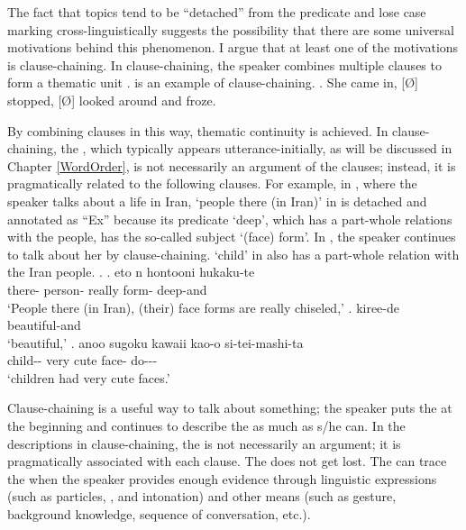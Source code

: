 The fact that topics tend to be ``detached'' from the predicate and
lose case marking cross-linguistically suggests the possibility that
there are some universal motivations behind this phenomenon.
I argue that at least one of the motivations is clause-chaining.
In clause-chaining,
the speaker combines multiple clauses to form a thematic unit
\cite{longacre85,martin92,givon01}.
\Next is an example of clause-chaining.
%
\ex. She came in, [\O] stopped, [\O] looked around and froze.\\
     \hfill{\cite[349]{givon01}}

By combining clauses in this way,
thematic continuity is achieved.
In clause-chaining,
the , which typically appears utterance-initially, as will be discussed in Chapter \ref{WordOrder},
is not necessarily an argument of the clauses;
instead, it is pragmatically related to the following clauses.
For example, in \Next,
where the speaker talks about a life in Iran,
 `people there (in Iran)' in \Next[a] is detached
and annotated as ``Ex''
because its predicate  `deep', which has a part-whole relations with the people, has the so-called subject  `(face) form'.
In \Next[b-c], the speaker continues to talk about her
by clause-chaining.
 `child' in \Next[c] also has a part-whole relation
with the Iran people.
%
\ex.
 \ag. eto n   hontooni  hukaku-te \\
        there- person- really form- deep-and \\
      `People there (in Iran), (their) face forms are really chiseled,'
 \bg. kiree-de \\
      beautiful-and \\
      `beautiful,'
 \bg.  anoo sugoku kawaii kao-o si-tei-mashi-ta \\
      child--  very cute face- do--- \\
      `children had very cute faces.'

Clause-chaining is a useful way to talk about something;
the speaker puts the  at the beginning and
continues to describe the  as much as s/he can.
In the descriptions in clause-chaining,
the  is not necessarily an argument;
it is pragmatically associated with each clause.
The  does not get lost.
The  can trace the 
when the speaker provides enough evidence
through linguistic expressions (such as particles, , and intonation) and other means (such as gesture, background knowledge, sequence of conversation, etc.).

